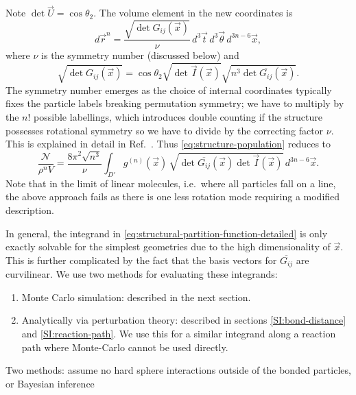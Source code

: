 \documentclass[11pt,twoside]{report}
\begin{document}
Note $\det{\vec{U}} = \cos{\theta_2}$.
The volume element in the new coordinates is
\begin{equation}
  d\vec{r}^n = \frac{\sqrt{\det G_{ij}(\vec{x})}}{\nu}
  \, d^3 \vec{t} \, d^3 \vec{\theta} \, d^{3n-6} \vec{x},
\end{equation}
where $\nu$ is the symmetry number (discussed below) and
\begin{equation}
  \sqrt{\det G_{ij}(\vec{x})} =
  \cos{\theta_2} \sqrt{\det{\vec{I}(\vec{x})}}
  \sqrt{n^3 \det{\overline{G_{ij}}(\vec{x})}}.
\end{equation}
The symmetry number emerges as the choice of internal coordinates typically fixes the particle labels breaking permutation symmetry; we have to multiply by the $n!$ possible labellings, which introduces double counting if the structure possesses rotational symmetry so we have to divide by the correcting factor $\nu$.
This is explained in detail in Ref.\ \cite{CatesSM2015}.
Thus \eqref{eq:structure-population} reduces to
\begin{equation}\label{eq:structural-partition-function-detailed}
  \frac{\mathcal{N}}{\rho^n V}
  =
  \frac{8\pi^2 \sqrt{n^3}}{\nu} \int_{D'}
  g^{(n)}(\vec{x}) \,
  \sqrt{\det{\overline{G_{ij}}(\vec{x})} \det{\vec{I}(\vec{x})}}
  \, d^{3n-6} \vec{x}.
\end{equation}
Note that in the limit of linear molecules, i.e.\ where all particles fall on a line, the above approach fails as there is one less rotation mode requiring a modified description.

In general, the integrand in \eqref{eq:structural-partition-function-detailed} is only exactly solvable for the simplest geometries due to the high dimensionality of $\vec{x}$.
This is further complicated by the fact that the basis vectors for $\overline{G_{ij}}$ are curvilinear.
We use two methods for evaluating these integrands:
\begin{enumerate}
\item Monte Carlo simulation: described in the next section.
\item Analytically via perturbation theory: described in sections \ref{SI:bond-distance} and \ref{SI:reaction-path}.
  We use this for a similar integrand along a reaction path where Monte-Carlo cannot be used directly.
\end{enumerate}

Two methods: assume no hard sphere interactions outside of the bonded particles, or Bayesian inference
\end{document}

